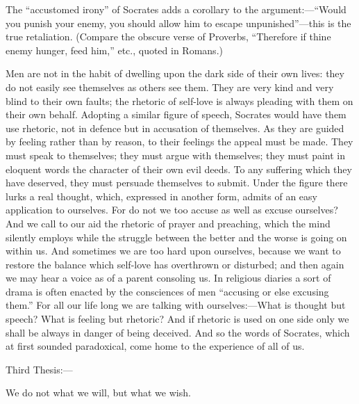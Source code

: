 \documentclass[11pt,letter]{article}
\begin{document}
\par  The “accustomed irony” of Socrates adds a corollary to the argument:—“Would you punish your enemy, you should allow him to escape unpunished”—this is the true retaliation. (Compare the obscure verse of Proverbs, “Therefore if thine enemy hunger, feed him,” etc., quoted in Romans.)

\par  Men are not in the habit of dwelling upon the dark side of their own lives: they do not easily see themselves as others see them. They are very kind and very blind to their own faults; the rhetoric of self-love is always pleading with them on their own behalf. Adopting a similar figure of speech, Socrates would have them use rhetoric, not in defence but in accusation of themselves. As they are guided by feeling rather than by reason, to their feelings the appeal must be made. They must speak to themselves; they must argue with themselves; they must paint in eloquent words the character of their own evil deeds. To any suffering which they have deserved, they must persuade themselves to submit. Under the figure there lurks a real thought, which, expressed in another form, admits of an easy application to ourselves. For do not we too accuse as well as excuse ourselves? And we call to our aid the rhetoric of prayer and preaching, which the mind silently employs while the struggle between the better and the worse is going on within us. And sometimes we are too hard upon ourselves, because we want to restore the balance which self-love has overthrown or disturbed; and then again we may hear a voice as of a parent consoling us. In religious diaries a sort of drama is often enacted by the consciences of men “accusing or else excusing them.” For all our life long we are talking with ourselves:—What is thought but speech? What is feeling but rhetoric? And if rhetoric is used on one side only we shall be always in danger of being deceived. And so the words of Socrates, which at first sounded paradoxical, come home to the experience of all of us.

\par  Third Thesis:—

\par  We do not what we will, but what we wish.
\end{document}
